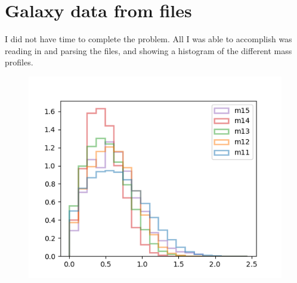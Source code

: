 \newpage
\section{Galaxy data from files}

I did not have time to complete the problem. All I was able to accomplish was reading in and parsing the files, and showing a histogram of the different mass profiles.




\begin{figure}[H]
    \centering
    \includegraphics[width=.5\textwidth]{output/3_hist.png}
\end{figure}
